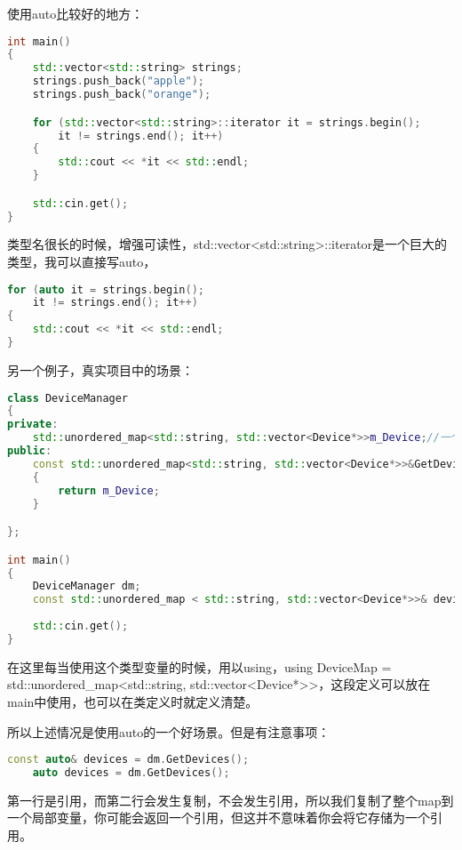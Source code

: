 使用{\ncodestyle auto}比较好的地方：

\begin{lstlisting}[language=c++]
int main()
{
    std::vector<std::string> strings;
    strings.push_back("apple");
    strings.push_back("orange");

    for (std::vector<std::string>::iterator it = strings.begin();
        it != strings.end(); it++)
    {
        std::cout << *it << std::endl;
    }

    std::cin.get();
}
\end{lstlisting}

类型名很长的时候，增强可读性，{\ncodestyle std::vector<std::string>::iterator}是一个巨大的类型，我可以直接写{\ncodestyle auto}，

\begin{lstlisting}[language=c++]
for (auto it = strings.begin();
    it != strings.end(); it++)
{
    std::cout << *it << std::endl;
}
\end{lstlisting}

另一个例子，真实项目中的场景：

\begin{lstlisting}[language=c++]
class DeviceManager
{
private:
    std::unordered_map<std::string, std::vector<Device*>>m_Device;//一个从string到vector<Device*>的map（映射），变量名叫m_Devices。
public:
    const std::unordered_map<std::string, std::vector<Device*>>&GetDevices() const
    {
        return m_Device;
    }

};

int main()
{
    DeviceManager dm;
    const std::unordered_map < std::string, std::vector<Device*>>& devices = dm.GetDevices();
    
    std::cin.get();
}
\end{lstlisting}

在这里每当使用这个类型变量的时候，用以{\ncodestyle using}，{\ncodestyle using DeviceMap = std::unordered_map<std::string, std::vector<Device*>>}，这段定义可以放在main中使用，也可以在类定义时就定义清楚。

所以上述情况是使用auto的一个好场景。但是有注意事项：

\begin{lstlisting}[language=c++]
    const auto& devices = dm.GetDevices();
    auto devices = dm.GetDevices();
\end{lstlisting}

第一行是引用，而第二行会发生复制，不会发生引用，所以我们复制了整个{\ncodestyle map}到一个局部变量，你可能会返回一个引用，但这并不意味着你会将它存储为一个引用。

